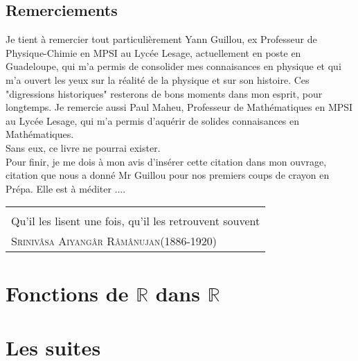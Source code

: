 \documentclass[a4paper, titlepage,twoside]{book}
\begin{document}
\chapter{Remerciements}
Je tient à remercier tout particulièrement Yann Guillou, ex Professeur de Physique-Chimie en MPSI au Lycée Lesage, actuellement en poste en Guadeloupe, qui m'a permis de consolider mes connaisances en physique et qui m'a ouvert les yeux sur la réalité de la physique et sur son histoire. Ces "digressions historiques" resterons de bons moments dans mon esprit, pour longtemps. Je remercie aussi Paul Maheu, Professeur de Mathématiques en MPSI au Lycée Lesage, qui m'a permis d'aquérir de solides connaisances en Mathématiques.\\
Sans eux, ce livre ne pourrai exister.\\
Pour finir, je me dois à mon avis d'insérer cette citation dans mon ouvrage, citation que nous a donné Mr Guillou pour nos premiers coups de crayon en Prépa. Elle est à méditer ....
  \begin{flushright}
    \begin{tabular}{@{}p{6cm}@{}}
      {\raggedleft \itshape Je suis convaincu qu'il est plus bénéfique pour un étudiant de retrouver des démonstrations à partir de quelques indications que de les lire et de les relire ....\\
      Qu'il les lisent une fois, qu'il les retrouvent souvent\par}\\

   {\raggedleft \textsc{Srinivâsa Aiyangâr Râmânujan}(1886-1920)\par}

 \end{tabular}

\end{flushright}




\mainmatter           %
\part{Fonctions de $\mathbb{R}$ dans $\mathbb{R}$}
\part{Les suites}
\end{document}
